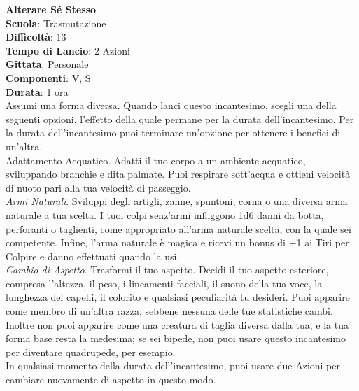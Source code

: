 \begin{multicols}{2}
\medskip\textbf{Alterare Sé Stesso}\\
\textbf{Scuola}: Trasmutazione\\
\textbf{Difficoltà}:  13\\
\textbf{Tempo di Lancio}: 2 Azioni\\
\textbf{Gittata}: Personale\\
\textbf{Componenti}: V, S\\
\textbf{Durata}: 1 ora\\
Assumi una forma diversa. Quando lanci questo incantesimo, scegli una della seguenti opzioni, l’effetto della quale permane per la durata dell'incantesimo. Per  la durata dell'incantesimo puoi terminare un'opzione per ottenere i benefici di un'altra.\\
Adattamento Acquatico. Adatti il tuo corpo a un ambiente acquatico, sviluppando branchie e dita palmate. Puoi respirare sott’acqua e ottieni velocità di nuoto pari alla tua velocità di passeggio.\\
\textit{Armi Naturali}. Sviluppi degli artigli, zanne, spuntoni, corna o una diversa arma naturale a tua scelta. I tuoi colpi senz’armi infliggono 1d6 danni da botta, perforanti o taglienti, come appropriato all'arma naturale scelta, con la quale sei competente. Infine, l’arma naturale è magica e ricevi un bonus di +1 ai Tiri per Colpire e danno effettuati quando la usi.\\
\textit{Cambio di Aspetto}. Trasformi il tuo aspetto. Decidi il tuo aspetto esteriore, compresa l’altezza, il peso, i lineamenti facciali, il suono della tua voce, la lunghezza dei capelli, il colorito e qualsiasi peculiarità tu desideri. Puoi apparire come membro di un'altra razza, sebbene nessuna delle tue statistiche cambi. Inoltre non puoi apparire come una creatura di taglia diversa dalla tua, e la tua forma base resta la medesima; se sei bipede, non puoi usare questo incantesimo per diventare quadrupede, per esempio.\\
In qualsiasi momento della durata dell'incantesimo, puoi usare due Azioni per cambiare nuovamente di aspetto in questo modo.\\


\end{multicols}
